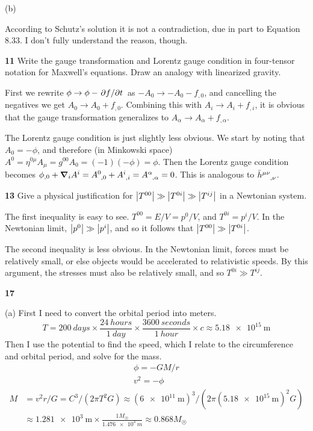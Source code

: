 \documentclass[gr-notes.tex]{subfiles}
\begin{document}
(b)

According to Schutz's solution it is not a contradiction, due in part to Equation 8.33. I don't fully understand the reason, though.


\textbf{11}
Write the gauge transformation and Lorentz gauge condition in four-tensor notation for Maxwell's equations. Draw an analogy with linearized gravity.

First we rewrite $\phi \to \phi - \pdv*{f}{t}$ as $-A_0 \to -A_0 - f_{,0}$, and cancelling the negatives we get $A_0 \to A_0 + f_{,0}$. Combining this with $A_i \to A_i + f_{,i}$, it is obvious that the gauge transformation generalizes to $A_\alpha \to A_\alpha + f_{,\alpha}$.

The Lorentz gauge condition is just slightly less obvious. We start by noting that $A_0 = -\phi$, and therefore (in Minkowski space) $A^0 = \eta^{0\mu} A_\mu = g^{00} A_0 = (-1) (-\phi) = \phi$. Then the Lorentz gauge condition  becomes $\phi_{,0} + \grad_i A^i = \tensor{A}{^0_{,0}} + \tensor{A}{^i_{,i}} = \tensor{A}{^\alpha_{,\alpha}} = 0$. This is analogous to $\tensor{\bar{h}}{^{\mu\nu}_{,\nu}}$.



\textbf{13}
Give a physical justification for $\abs{T^{00}} \gg \abs{T^{0i}} \gg \abs{T^{ij}}$ in a Newtonian system.

The first inequality is easy to see. $T^{00} = E / V = p^0 / V$, and $T^{0i} = p^i / V$. In the Newtonian limit, $\abs{p^0} \gg \abs{p^i}$, and so it follows that $\abs{T^{00}} \gg \abs{T^{0i}}$.

The second inequality is less obvious. In the Newtonian limit, forces must be relatively small, or else objects would be accelerated to relativistic speeds. By this argument, the stresses must also be relatively small, and so $T^{0i} \gg T^{ij}$.

\textbf{17}

(a) First I need to convert the orbital period into meters.
%
\begin{displaymath}
  T =
  \SI{200}{days} \times
  \frac{\SI{24}{hours}}{\SI{1}{day}} \times
  \frac{\SI{3600}{seconds}}{\SI{1}{hour}} \times
  c \approx
  \SI{5.18e15}{\meter}
\end{displaymath}
%
Then I use the potential to find the speed, which I relate to the circumference and orbital period, and solve for the mass.
%
\begin{gather*}
  \phi = -G M / r
  \\
  v^2 = -\phi
\end{gather*}
\begin{align*}
  M &= v^2 r / G = C^3 / (2 \pi T^2 G) \approx
  (\SI{6e11}{\meter})^3 / (2 \pi (\SI{5.18e15}{\meter})^2 G)
  \\ &\approx
  \SI{1.281e3}{\meter} \times \frac{1 M_\Sun}{\SI{1.476e3}{m}} \approx
  0.868 M_\Sun
\end{align*}
\end{document}
